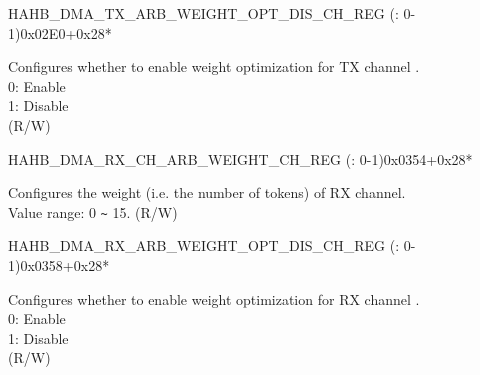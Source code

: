 \begin{register}{H}{AHB\_DMA\_TX\_ARB\_WEIGHT\_OPT\_DIS\_CH\_REG (: 0-1)}{0x02E0+0x28*}\label{regdesc:AHBDMATXARBWEIGHTOPTDISCHNREG}
%
%
\regnewline%
\begin{regdesc}\begin{reglist}
\label{fielddesc:AHBDMATXARBWEIGHTOPTDISCHN}\item [AHB\_DMA\_TX\_ARB\_WEIGHT\_OPT\_DIS\_CH\regindex{n}] Configures whether to enable weight optimization for TX channel .\\
0: Enable\\
1: Disable\\ (R/W)
\end{reglist}\end{regdesc}
\end{register}


\begin{register}{H}{AHB\_DMA\_RX\_CH\_ARB\_WEIGHT\_CH\_REG (: 0-1)}{0x0354+0x28*}\label{regdesc:AHBDMARXCHARBWEIGHTCHNREG}
%
%
\regnewline%
\begin{regdesc}\begin{reglist}
\label{fielddesc:AHBDMARXCHARBWEIGHTCHN}\item [AHB\_DMA\_RX\_CH\_ARB\_WEIGHT\_CH\regindex{n}] Configures the weight (i.e. the number of tokens) of RX channel. \\Value range: 0 \verb+~+ 15. (R/W)
\end{reglist}\end{regdesc}
\end{register}


\begin{register}{H}{AHB\_DMA\_RX\_ARB\_WEIGHT\_OPT\_DIS\_CH\_REG (: 0-1)}{0x0358+0x28*}\label{regdesc:AHBDMARXARBWEIGHTOPTDISCHNREG}
%
%
\regnewline%
\begin{regdesc}\begin{reglist}
\label{fielddesc:AHBDMARXARBWEIGHTOPTDISCHN}\item [AHB\_DMA\_RX\_ARB\_WEIGHT\_OPT\_DIS\_CH\regindex{n}] Configures whether to enable weight optimization for RX channel .\\
0: Enable\\
1: Disable\\ (R/W)
\end{reglist}\end{regdesc}
\end{register}


